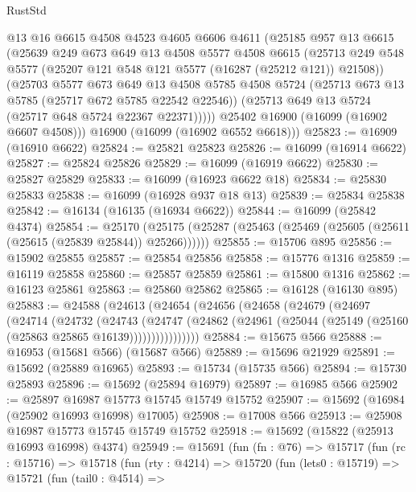 \begin{lexlean}{RustStd}
\begin{coremodule}
        @13
        @16
        @6615
        @4508
        @4523
        @4605
        @6606
        @4611
        (@25185
          @957
          @13
          @6615
          (@25639
            @249
            @673
            @649
            @13
            @4508
            @5577
            @4508
            @6615
            (@25713 @249 @548 @5577 (@25207 @121 @548 @121 @5577 (@16287 (@25212 @121)) @21508))
            (@25703
              @5577
              @673
              @649
              @13
              @4508
              @5785
              @4508
              @5724
              (@25713 @673 @13 @5785 (@25717 @672 @5785 @22542 @22546))
              (@25713 @649 @13 @5724 (@25717 @648 @5724 @22367 @22371)))))
        @25402
        @16900
        (@16099 (@16902 @6607 @4508)))
      @16900
      (@16099 (@16902 @6552 @6618)))
@25823 := @16909 (@16910 @6622)
@25824 := @25821 @25823
@25826 := @16099 (@16914 @6622)
@25827 := @25824 @25826
@25829 := @16099 (@16919 @6622)
@25830 := @25827 @25829
@25833 := @16099 (@16923 @6622 @18)
@25834 := @25830 @25833
@25838 := @16099 (@16928 @937 @18 @13)
@25839 := @25834 @25838
@25842 := @16134 (@16135 (@16934 @6622))
@25844 := @16099 (@25842 @4374)
@25854 := @25170
    (@25175 (@25287 (@25463 (@25469 (@25605 (@25611 (@25615 (@25839 @25844)) @25266))))))
@25855 := @15706 @895
@25856 := @15902 @25855
@25857 := @25854 @25856
@25858 := @15776 @1316
@25859 := @16119 @25858
@25860 := @25857 @25859
@25861 := @15800 @1316
@25862 := @16123 @25861
@25863 := @25860 @25862
@25865 := @16128 (@16130 @895)
@25883 := @24588
    (@24613
      (@24654
        (@24656
          (@24658
            (@24679
              (@24697
                (@24714
                  (@24732
                    (@24743
                      (@24747
                        (@24862
                          (@24961 (@25044 (@25149 (@25160 (@25863 @25865 @16139))))))))))))))))
@25884 := @15675 @566
@25888 := @16953 (@15681 @566) (@15687 @566)
@25889 := @15696 @21929
@25891 := @15692 (@25889 @16965)
@25893 := @15734 (@15735 @566)
@25894 := @15730 @25893
@25896 := @15692 (@25894 @16979)
@25897 := @16985 @566
@25902 := @25897 @16987 @15773 @15745 @15749 @15752
@25907 := @15692 (@16984 (@25902 @16993 @16998) @17005)
@25908 := @17008 @566
@25913 := @25908 @16987 @15773 @15745 @15749 @15752
@25918 := @15692 (@15822 (@25913 @16993 @16998) @4374)
@25949 := @15691
    (fun (fn : @76) =>
    @15717
      (fun (rc : @15716) =>
      @15718
        (fun (rty : @4214) =>
        @15720
          (fun (lets0 : @15719) =>
          @15721
            (fun (tail0 : @4514) =>

\end{coremodule}
\end{lexlean}
